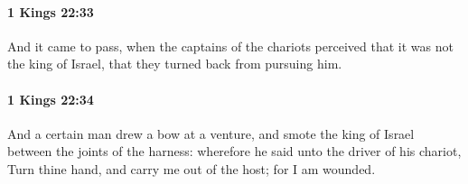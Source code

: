 		\paragraph{1 Kings 22:33} %
			\label{1KINGS-22-33}

			And it came to pass, when the captains of the chariots perceived that it was not the king of Israel, that they turned back from pursuing him.


		\paragraph{1 Kings 22:34} %
			\label{1KINGS-22-34}

			And a certain man drew a bow at a venture, and smote the king of Israel between the joints of the harness: wherefore he said unto the driver of his chariot, Turn thine hand, and carry me out of the host; for I am wounded.


